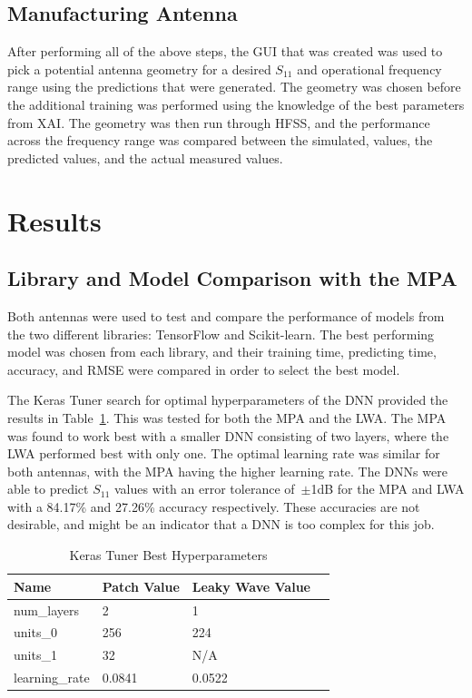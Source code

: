 \documentclass[conference]{IEEEtran}
\begin{document}
\subsection{Manufacturing Antenna}
After performing all of the above steps, the GUI that was created was used to pick a potential antenna geometry for a desired $S_{11}$ and operational frequency range using the predictions that were generated. The geometry was chosen before the additional training was performed using the knowledge of the best parameters from XAI. The geometry was then run through HFSS, and the performance across the frequency range was compared between the simulated, values, the predicted values, and the actual measured values. 


\section{Results}
\subsection{Library and Model Comparison with the MPA}
Both antennas were used to test and compare the performance of models from the two different libraries: TensorFlow and Scikit-learn. The best performing model was chosen from each library, and their training time, predicting time, accuracy, and RMSE were compared in order to select the best model.

The Keras Tuner search for optimal hyperparameters of the DNN provided the results in Table~\ref{keras_best_params}. This was tested for both the MPA and the LWA. The MPA was found to work best with a smaller DNN consisting of two layers, where the LWA performed best with only one. The optimal learning rate was similar for both antennas, with the MPA having the higher learning rate. The DNNs were able to predict $S_{11}$ values with an error tolerance of~$\pm$1dB for the MPA and LWA with a 84.17\% and 27.26\% accuracy respectively. These accuracies are not desirable, and might be an indicator that a DNN is too complex for this job.

\begin{table}[h]
\caption{Keras Tuner Best Hyperparameters}
\begin{center}
\begin{tabular}{ |l|l|l|l| }
    \hline
    Name & Patch Value & Leaky Wave Value \\ 
    \hline
    num\_layers & 2 & 1 \\  
    \hline
    units\_0 & 256 & 224 \\
    \hline
    units\_1 & 32 & N/A \\
    \hline
    learning\_rate & 0.0841 & 0.0522 \\
    \hline
\end{tabular}
\end{center}
\label{keras_best_params}
\end{table}
\end{document}
